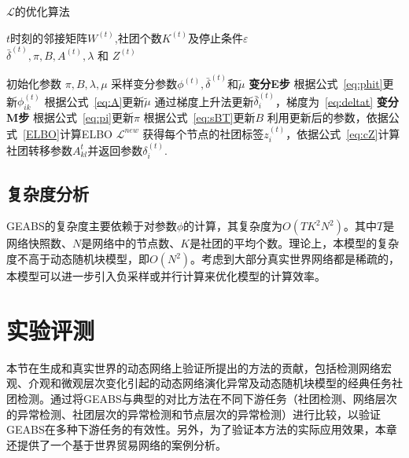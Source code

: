 \begin{algorithm}[H]
\caption{$\mathcal{L}$的优化算法}\label{chap4:alg1}
\algorithmicrequire \;$t$时刻的邻接矩阵$W^{(t)}$,社团个数$K^{(t)}$及停止条件$\varepsilon$\\
\algorithmicensure \;$\bar{\delta}^{(t)}, \pi, B, A^{(t)},\lambda$ 和 $Z^{(t)}$
\begin{algorithmic}[1]
\STATE 初始化参数 $\pi,B,\lambda, \mu$
\STATE 采样变分参数$\phi^{(t)},\bar{\delta}^{(t)}$和$\tilde{\mu}$
\REPEAT
    \STATE \textbf{变分E步}
    \STATE 根据公式~\ref{eq:phit}更新$\phi^{(t)}_{ik}$
    \STATE 根据公式~\ref{eq:A}更新$\tilde{\mu}$
     \STATE 通过梯度上升法更新$\bar{\delta}_i^{(t)}$，梯度为~\ref{eq:deltat}
    \STATE \textbf{变分M步}
    \STATE 根据公式~\ref{eq:pi}更新$\pi$
    \STATE 根据公式~\ref{eq:sBT}更新$B$
    \STATE 利用更新后的参数，依据公式~\ref{ELBO}计算ELBO $\mathcal{L}^{new}$
\ENDFOR
{}
\STATE 获得每个节点的社团标签$z^{(t)}_i$，依据公式~\ref{eq:cZ}计算社团转移参数$A_{kl}^t$并返回参数$\delta^{(t)}_i$.
\ENDFOR  
\end{algorithmic}
\end{algorithm}

\subsection{复杂度分析}
GEABS的复杂度主要依赖于对参数$\phi$的计算，其复杂度为$O(TK^2N^2)$。其中$T$是网络快照数、$N$是网络中的节点数、$K$是社团的平均个数。理论上，本模型的复杂度不高于动态随机块模型，即$O(N^2)$。考虑到大部分真实世界网络都是稀疏的，本模型可以进一步引入负采样或并行计算来优化模型的计算效率。

\section{实验评测\label{chap4:experiment}}

本节在生成和真实世界的动态网络上验证所提出的方法的贡献，包括检测网络宏观、介观和微观层次变化引起的动态网络演化异常及动态随机块模型的经典任务社团检测。通过将GEABS与典型的对比方法在不同下游任务（社团检测、网络层次的异常检测、社团层次的异常检测和节点层次的异常检测）进行比较，以验证GEABS在多种下游任务的有效性。另外，为了验证本方法的实际应用效果，本章还提供了一个基于世界贸易网络的案例分析。

